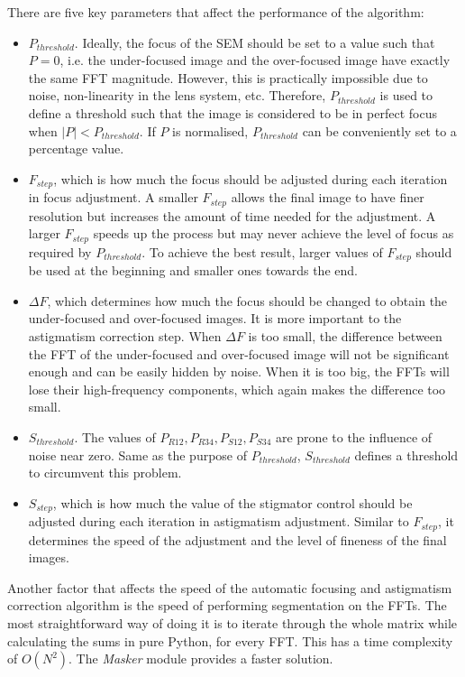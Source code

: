\documentclass[12pt, conference]{IEEEtran}
\begin{document}
There are five key parameters that affect the performance of the algorithm:
\begin{itemize}
    \item $P_{threshold}$. Ideally, the focus of the SEM should be set to a value such that $P = 0$, i.e. the under-focused image and the over-focused image have exactly the same FFT magnitude. However, this is practically impossible due to noise, non-linearity in the lens system, etc. Therefore, $P_{threshold}$ is used to define a threshold such that the image is considered to be in perfect focus when $|P| < P_{threshold}$. If $P$ is normalised, $P_{threshold}$ can be conveniently set to a percentage value.
    \item $F_{step}$, which is how much the focus should be adjusted during each iteration in focus adjustment. A smaller $F_{step}$ allows the final image to have finer resolution but increases the amount of time needed for the adjustment. A larger $F_{step}$ speeds up the process but may never achieve the level of focus as required by $P_{threshold}$. To achieve the best result, larger values of $F_{step}$ should be used at the beginning and smaller ones towards the end.
    \item $\Delta F$, which determines how much the focus should be changed to obtain the under-focused and over-focused images. It is more important to the astigmatism correction step. When $\Delta F$ is too small, the difference between the FFT of the under-focused and over-focused image will not be significant enough and can be easily hidden by noise. When it is too big, the FFTs will lose their high-frequency components, which again makes the difference too small.
    \item $S_{threshold}$. The values of $P_{R12}, P_{R34}, P_{S12}, P_{S34}$ are prone to the influence of noise near zero. Same as the purpose of $P_{threshold}$, $S_{threshold}$ defines a threshold to circumvent this problem.
    \item $S_{step}$, which is how much the value of the stigmator control should be adjusted during each iteration in astigmatism adjustment. Similar to $F_{step}$, it determines the speed of the adjustment and the level of fineness of the final images.
\end{itemize}

Another factor that affects the speed of the automatic focusing and astigmatism correction algorithm is the speed of performing segmentation on the FFTs. The most straightforward way of doing it is to iterate through the whole matrix while calculating the sums in pure Python, for every FFT. This has a time complexity of $O(N^2)$. The \textit{Masker} module provides a faster solution.
\end{document}
